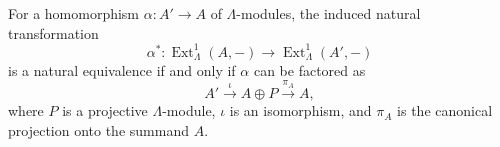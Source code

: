 \begin{theorem}\label{thm:10.4}
For a homomorphism $\alpha \colon A' \to A$ of $\Lambda$-modules, the induced natural transformation
$$
\alpha^* \colon \operatorname{Ext}_\Lambda^1(A, -) \longrightarrow \operatorname{Ext}_\Lambda^1(A', -)
$$
is a natural equivalence if and only if $\alpha$ can be factored as
$$
A' \xrightarrow{\iota} A \oplus P \xrightarrow{\pi_A} A,
$$
where $P$ is a projective $\Lambda$-module, $\iota$ is an isomorphism, and $\pi_A$ is the canonical projection onto the summand $A$.
\end{theorem}
